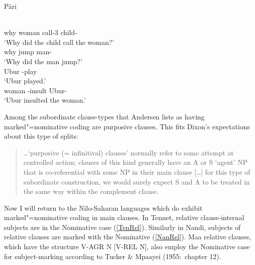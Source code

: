 \begin{exe}\ex\label{ParMN} {P\"ari} \citep[Nilotic; Sudan; ][319, 318, 292]{Andersen:1988}\nopagebreak[4]
\begin{xlist}
\ex\gll {}   \\
why woman call-3\sg{} child-\erg{}\\
`Why did the child call the woman?'
\ex\gll{}  \\
why jump man-\erg{}\\
`Why did the man jump?'
\ex\gll{} \\
Ubur \compl{}-play\\
`Ubur played.'
\ex\gll{}  \\
woman \compl{}-insult Ubur-\erg{}\\
`Ubur insulted the woman.'
\end{xlist}
\end{exe} %

Among the subordinate clause-types that Andersen lists as having marked"=nominative coding are purposive clauses.  
This fits Dixon's expectations about this type of splits:

\begin{quote}
\dots `purposive (= infinitival) clauses' normally refer to some attempt at controlled action; clauses of this kind generally have an A or S `agent' NP that is co-referential with some NP in their main clause [\dots] for this type of subordinate construction, we would surely expect S and A to be treated in the same way within the complement clause. 
\citep[101f.]{Dixon:1994}
\end{quote}

Now I will return to the Nilo-Saharan languages which do exhibit marked"=nominative coding in main clauses.
In Tennet, relative clause-internal subjects are in the Nominative  case (\ref{TenRel}).
Similarly in Nandi, subjects of relative clauses are marked with the Nominative  (\ref{NanRel}).
Maa relative clauses, which have the structure V-AGR N [V-REL N], also employ the Nominative  case for subject-marking according to Tucker \& Mpaayei (1955:~chapter 12).%

